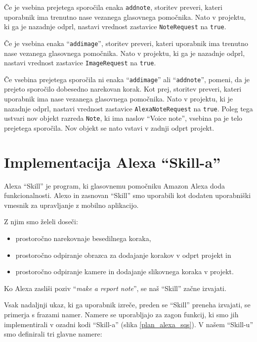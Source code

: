 \documentclass[a4paper, 12pt]{book}
\begin{document}
Če je vsebina prejetega sporočila enaka \texttt{addnote}, storitev preveri, kateri uporabnik ima trenutno nase vezanega glasovnega pomočnika.
Nato v projektu, ki ga je nazadnje odprl, nastavi vrednost zastavice \texttt{NoteRequest} na \texttt{true}.


Če je vsebina enaka \enquote{\texttt{addimage}}, storitev preveri, kateri uporabnik ima trenutno nase vezanega glasovnega pomočnika.
Nato v projektu, ki ga je nazadnje odprl, nastavi vrednost zastavice \texttt{ImageRequest} na \texttt{true}.

Če vsebina prejetega sporočila ni enaka \enquote{\texttt{addimage}} ali \enquote{\texttt{addnote}}, pomeni, da je prejeto sporočilo dobesedno narekovan korak.
Kot prej, storitev preveri, kateri uporabnik ima nase vezanega glasovnega pomočnika.
Nato v projektu, ki je nazadnje odprl, nastavi vrednost zastavice \texttt{AlexaNoteRequest} na \texttt{true}.
Poleg tega ustvari nov objekt razreda \texttt{Note}, ki ima naslov \enquote{Voice note}, vsebina pa je telo prejetega sporočila.
Nov objekt se nato vstavi v zadnji odprt projekt.



\section{Implementacija Alexa \enquote{Skill-a}}

Alexa \enquote{Skill} je program, ki glasovnemu pomočniku Amazon Alexa doda funkcionalnosti.
Alexo in zasnovan \enquote{Skill} smo uporabili kot dodaten uporabniški vmesnik za upravljanje z mobilno aplikacijo.

\noindent Z njim smo želeli doseči:
\begin{itemize}
	\item prostoročno narekovnaje besedilnega koraka,
	\item prostoročno odpiranje obrazca za dodajanje korakov v odprt projekt in
	\item prostoročno odpiranje kamere in dodajanje slikovnega koraka v projekt.
\end{itemize}



Ko Alexa zasliši poziv \enquote{\textit{make a report note}}, se naš \enquote{Skill} začne izvajati.

Vsak nadaljnji ukaz, ki ga uporabnik izreče, preden se \enquote{Skill} preneha izvajati, se primerja s frazami namer.
Namere se uporabljajo za zagon funkcij, ki smo jih implementirali v ozadni kodi \enquote{Skill-a} (slika \ref{plan_alexa_sqs}).
V našem \enquote{Skill-u} smo definirali tri glavne namere:
\end{document}
